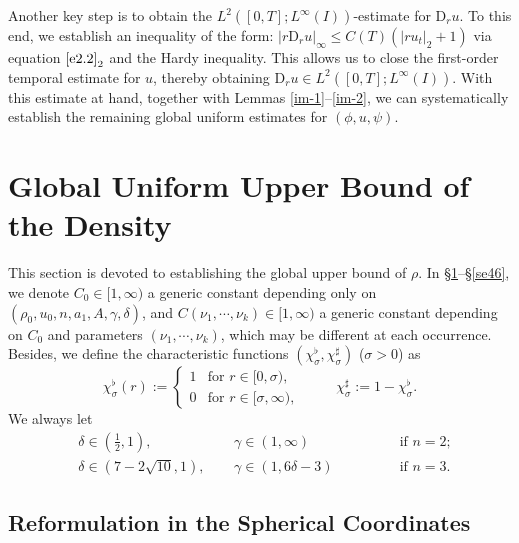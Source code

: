 \documentclass[11pt,reqno]{amsart}
\numberwithin{rk}{section}
\numberwithin{prop}{section}
\numberwithin{mydef}{section}
\numberwithin{lem}{section}
\numberwithin{equation}{section}
\numberwithin{thm}{section}
\begin{document}
Another key step is to obtain the $L^2([0,T];L^\infty(I))$-estimate for $\mathrm{D}_r u$. To this end, we establish an inequality of the form: $|r\mathrm{D}_r u|_{\infty}\leq C(T)(|ru_t|_{2}+1)$ via equation $\eqref{e2.2}_2$ and the Hardy inequality. This allows us to close the first-order temporal estimate for $u$, thereby obtaining $\mathrm{D}_r u\in L^2([0,T];L^\infty(I))$. With this estimate at hand, together with Lemmas \ref{im-1}--\ref{im-2}, we can systematically establish the remaining global uniform estimates for $(\phi,u,\psi)$.




\section{Global Uniform Upper Bound of the Density}\label{section-upper-density}

This section is devoted to establishing the global upper bound of $\rho$. In \S\ref{section-upper-density}--\S \ref{se46}, we denote $C_0 \in[1, \infty)$ a generic constant depending only on $\left(\rho_0, u_0, n, a_1, A, \gamma,\delta\right)$, and $C\left(\nu_1, \cdots\!, \nu_k\right) \in[1, \infty)$ a generic constant depending on $C_0$ and parameters $\left(\nu_1, \cdots\!, \nu_k\right)$, which may be different at each occurrence. Besides, we define the characteristic functions $(\chi^\flat_\sigma,\chi^\sharp_\sigma)$ ($\sigma>0$) as
\begin{equation}\label{chi-sigma}
\chi^\flat_\sigma(r):=
\begin{cases}
1&\text{for $r\in[0,\sigma)$},\\
0&\text{for $r\in[\sigma,\infty)$},
\end{cases}\qquad \ \ \chi^\sharp_\sigma:=1-\chi^\flat_\sigma.
\end{equation}
We always let 
\begin{equation}\label{del-gam}
\begin{aligned}
&\delta\in (\frac{1}{2},1),\ \ &&\gamma\in (1,\infty)\qquad\,\, &&&\text{if $n=2$};\\
&\delta\in (7-2\sqrt{10},1),\ \ &&\gamma\in (1,6\delta-3)\qquad\,\, &&&\text{if $n=3$}.
\end{aligned}
\end{equation}

\subsection{Reformulation in the Spherical Coordinates}
\end{document}
